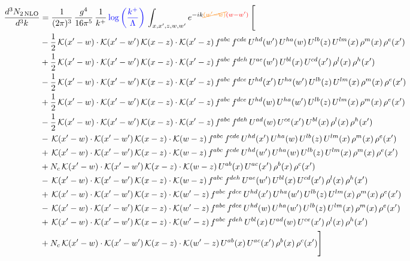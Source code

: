 \documentclass[9pt]{article}
\numberwithin{equation}{section}
\begin{document}
\begin{align}
\frac{d^{3}N_{2\,\mathrm{NLO}}}{d^{3}k} & = \frac{1}{(2\pi)^{3}}\,\frac{g^{4}}{16\pi^{5}}\,\frac{1}{k^{+}}\,{\color{blue}\log{\left(\frac{k^{+}}{\Lambda}\right)}}\,\int_{x,x',z,w,w'}e^{-ik{\color{orange}\cancel{(w'-w)}}{\color{red}(w-w')}}\,\Bigg[\notag\\ & -\frac{1}{2}\,\mathcal{K}(x'-w)\cdot\mathcal{K}(x'-w')\,\mathcal{K}(x-z)\cdot\mathcal{K}(x'-z)\,f^{abc}\,f^{cde}\,U^{hd}(w')\,U^{ha}(w)\,U^{lb}(z)\,U^{lm}(x)\,\rho^{m}(x)\,\rho^{e}(x')\notag\\
& +\frac{1}{2}\,\mathcal{K}(x'-w)\cdot\mathcal{K}(x'-w')\,\mathcal{K}(x-z)\cdot\mathcal{K}(x'-z)\,f^{abc}\,f^{deh}\,U^{ae}(w')\,U^{bl}(x)\,U^{cd}(x')\,\rho^{l}(x)\,\rho^{h}(x')\notag\\
& -\frac{1}{2}\,\mathcal{K}(x'-w)\cdot\mathcal{K}(x'-w')\,\mathcal{K}(x-z)\cdot\mathcal{K}(x'-z)\,f^{abc}\,f^{dce}\,U^{hd}(x')\,U^{ha}(w')\,U^{lb}(z)\,U^{lm}(x)\,\rho^{m}(x)\,\rho^{e}(x')\notag\\
& +\frac{1}{2}\,\mathcal{K}(x'-w)\cdot\mathcal{K}(x'-w')\,\mathcal{K}(x-z)\cdot\mathcal{K}(x'-z)\,f^{abc}\,f^{dce}\,U^{hd}(w)\,U^{ha}(w')\,U^{lb}(z)\,U^{lm}(x)\,\rho^{m}(x)\,\rho^{e}(x')\notag\\
& -\frac{1}{2}\,\mathcal{K}(x'-w)\cdot\mathcal{K}(x'-w')\,\mathcal{K}(x-z)\cdot\mathcal{K}(x'-z)\,f^{abc}\,f^{deh}\,U^{ad}(w)\,U^{ce}(x')\,U^{bl}(x)\,\rho^{l}(x)\,\rho^{h}(x')\notag\\
& -\,\mathcal{K}(x'-w)\cdot\mathcal{K}(x'-w')\,\mathcal{K}(x-z)\cdot\mathcal{K}(w-z)\,f^{abc}\,f^{cde}\,U^{hd}(x')\,U^{ha}(w)\,U^{lb}(z)\,U^{lm}(x)\,\rho^{m}(x)\,\rho^{e}(x') \notag \\ &  +\,\mathcal{K}(x'-w)\cdot\mathcal{K}(x'-w')\,\mathcal{K}(x-z)\cdot\mathcal{K}(w-z)\,f^{abc}\,f^{cde}\,U^{hd}(w')\,U^{ha}(w)\,U^{lb}(z)\,U^{lm}(x)\,\rho^{m}(x)\,\rho^{e}(x')\notag\\
& +N_{c}\,\mathcal{K}(x'-w)\cdot\mathcal{K}(x'-w')\,\mathcal{K}(x-z)\cdot\mathcal{K}(w-z)\,U^{ab}(x)\,U^{ac}(x')\,\rho^{b}(x)\,\rho^{c}(x')\notag\\
& -\,\mathcal{K}(x'-w)\cdot\mathcal{K}(x'-w')\,\mathcal{K}(x-z)\cdot\mathcal{K}(w-z)\,f^{abc}\,f^{deh}\,U^{ae}(w')\,U^{bl}(x)\,U^{cd}(x')\,\rho^{l}(x)\,\rho^{h}(x')\notag\\
& +\,\mathcal{K}(x'-w)\cdot\mathcal{K}(x'-w')\,\mathcal{K}(x-z)\cdot\mathcal{K}(w'-z)\,f^{abc}\,f^{dce}\,U^{hd}(x')\,U^{ha}(w')\,U^{lb}(z)\,U^{lm}(x)\,\rho^{m}(x)\,\rho^{e}(x')\notag\\
& -\,\mathcal{K}(x'-w)\cdot\mathcal{K}(x'-w')\,\mathcal{K}(x-z)\cdot\mathcal{K}(w'-z)\,f^{abc}\,f^{dce}\,U^{hd}(w)\,U^{ha}(w')\,U^{lb}(z)\,U^{lm}(x)\,\rho^{m}(x)\,\rho^{e}(x')\notag\\
& +\,\mathcal{K}(x'-w)\cdot\mathcal{K}(x'-w')\,\mathcal{K}(x-z)\cdot\mathcal{K}(w'-z)\,f^{abc}\,f^{deh}\,U^{bl}(x)\,U^{ad}(w)\,U^{ce}(x')\,\rho^{l}(x)\,\rho^{h}(x')\notag\\
& +N_{c}\,\mathcal{K}(x'-w)\cdot\mathcal{K}(x'-w')\,\mathcal{K}(x-z)\cdot\mathcal{K}(w'-z)\,U^{ab}(x)\,U^{ac}(x')\,\rho^{b}(x)\,\rho^{c}(x')\Bigg]
\end{align}
\end{document}
